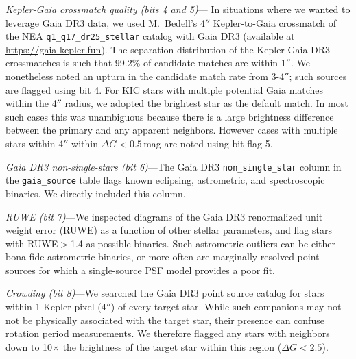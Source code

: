 \documentclass[11pt,twocolumn,tighten]{aastex63}
\begin{document}
{\it Kepler-Gaia crossmatch quality (bits 4 and 5)}--- In situations
where we wanted to leverage Gaia DR3 data, we used M.~Bedell's 4$''$
Kepler-to-Gaia crossmatch %
of the NEA \texttt{q1\_q17\_dr25\_stellar} catalog with Gaia DR3
(available at \url{https://gaia-kepler.fun}).  The
separation distribution of the Kepler-Gaia DR3 crossmatches is such
that 99.2\% of candidate matches are within 1$''$.   We nonetheless
noted an upturn in the candidate match rate from 3-4$''$; such sources
are flagged using bit 4.  For KIC stars with multiple potential Gaia
matches within the 4$''$ radius, we adopted the brightest star as the
default match.  In most such cases this was unambiguous because there
is a large brightness difference between the primary and any apparent
neighbors.  However cases with multiple stars within 4$''$ within
$\Delta G$$<$$0.5$\,mag are noted using bit flag 5.  

{\it Gaia DR3 non-single-stars (bit 6)}---The Gaia DR3
\texttt{non\_single\_star} column in the \texttt{gaia\_source} table
flags known eclipsing, astrometric, and spectroscopic binaries.  We
directly included this column.

{\it RUWE (bit 7)}---We inspected diagrams of the Gaia DR3
renormalized unit weight error (RUWE) as a function of other stellar
parameters, and flag stars with RUWE$>$1.4 as possible binaries.  Such
astrometric outliers can be either bona fide astrometric binaries, or
more often are marginally resolved point sources for which a
single-source PSF model provides a poor fit.

{\it Crowding (bit 8)}---We searched the Gaia DR3 point source catalog
for stars within 1 Kepler pixel (4$''$) of every target star.  While
such companions may not not be physically associated with the target
star, their presence can confuse rotation period measurements.  We
therefore flagged any stars with neighbors down to 10$\times$ the
brightness of the target star within this region ($\Delta G < 2.5$).
\end{document}
